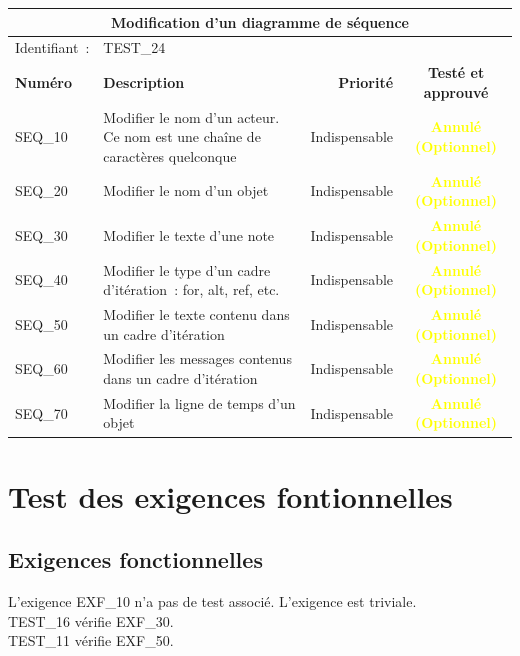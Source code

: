 \documentclass[hidelinks, a4paper,11pt,twoside,final]{article}
\begin{document}
\begin{center}
    \begin{tabular}{|l|p{8cm}|r|c|}
        \hline\multicolumn{4}{|c|}{Modification d’un diagramme de séquence} \\\hline
        {Identifiant~:} & \multicolumn{3}{|p{10cm}|}{TEST\_24} \\\hline
        {\textbf{Numéro}} & {\textbf{Description}} & {\textbf{Priorité}} & {\textbf{Testé et approuvé}}\\\hline
        {SEQ\_10} & {Modifier le nom d’un acteur. Ce nom est une chaîne de caractères quelconque} & {Indispensable} & {\textcolor{yellow}{\textbf{Annulé (Optionnel)}}}\\\hline
        {SEQ\_20} & {Modifier le nom d’un objet} & {Indispensable} & {\textcolor{yellow}{\textbf{Annulé (Optionnel)}}}\\\hline
        {SEQ\_30} & {Modifier le texte d’une note} & {Indispensable} & {\textcolor{yellow}{\textbf{Annulé (Optionnel)}}}\\\hline
        {SEQ\_40} & {Modifier le type d’un cadre d’itération~: for, alt, ref, etc.} & {Indispensable} & {\textcolor{yellow}{\textbf{Annulé (Optionnel)}}}\\\hline
        {SEQ\_50} & {Modifier le texte contenu dans un cadre d’itération} & {Indispensable} & {\textcolor{yellow}{\textbf{Annulé (Optionnel)}}}\\\hline
        {SEQ\_60} & {Modifier les messages contenus dans un cadre d’itération} & {Indispensable} & {\textcolor{yellow}{\textbf{Annulé (Optionnel)}}}\\\hline
        {SEQ\_70} & {Modifier la ligne de temps d’un objet} & {Indispensable} & {\textcolor{yellow}{\textbf{Annulé (Optionnel)}}}\\\hline
    \end{tabular}
\end{center}


\section{Test des exigences fontionnelles}
\subsection*{Exigences fonctionnelles}
  L’exigence EXF\_10 n’a pas de test associé. L’exigence est triviale.\\ 
  TEST\_16 vérifie EXF\_30.\\
  TEST\_11 vérifie EXF\_50.
  
\end{document}
